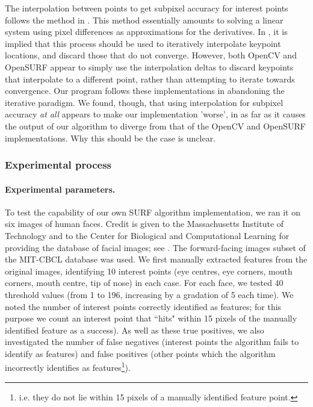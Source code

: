 The interpolation between points to get subpixel accuracy for interest points follows the method in \cite{inv-features}. This method essentially amounts to solving a linear system using pixel differences as approximations for the derivatives. In \cite{SURF}, it is implied that this process should be used to iteratively interpolate keypoint locations, and discard those that do not converge. However, both OpenCV and OpenSURF appear to simply use the interpolation deltas to discard keypoints that interpolate to a different point, rather than attempting to iterate towards convergence. Our program follows these implementations in abandoning the iterative paradigm. We found, though, that using interpolation for subpixel accuracy \emph{at all} appears to make our implementation 'worse', in as far as it causes the output of our algorithm to diverge from that of the OpenCV and OpenSURF implementations. Why this should be the case is unclear.

\subsubsection{Experimental process}

\paragraph{Experimental parameters.}
To test the capability of our own SURF algorithm implementation, we ran it on six images of human faces. Credit is given to the Massachusetts Institute of Technology and to the Center for Biological and Computational Learning for providing the database of facial images; see \cite{database}. The forward-facing images subset of the MIT-CBCL database was used. We first manually extracted features from the original images, identifying 10 interest points (eye centres, eye corners, mouth corners, mouth centre, tip of nose) in each case. 
For each face, we tested 40 threshold values (from 1 to 196, increasing by a gradation of 5 each time). We noted the number of interest points correctly identified as features; for this purpose we count an interest point that ``hits" within 15 pixels of the manually identified feature as a success). As well as these true positives, we also investigated the number of false negatives (interest points the algorithm fails to identify as features) and false positives (other points which the algorithm incorrectly identifies as features\footnote{i.e. they do not lie within 15 pixels of a manually identified feature point.}).

